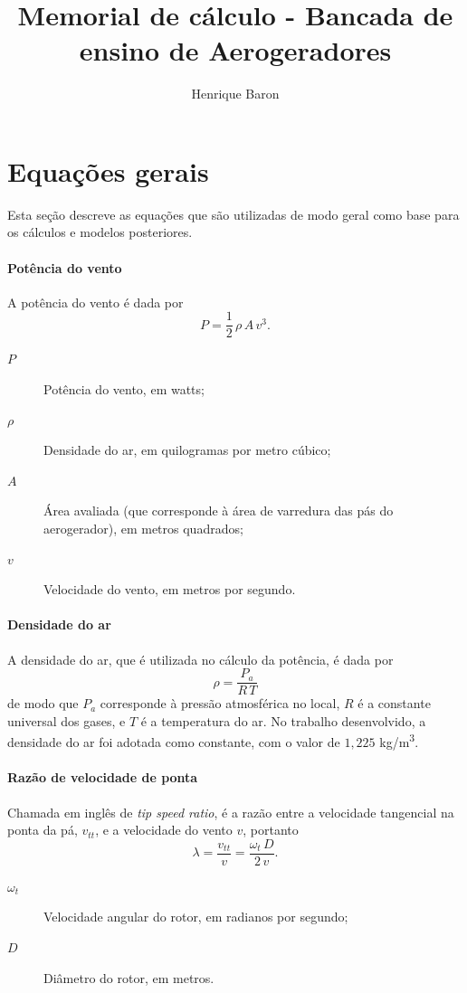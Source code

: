 \documentclass{article}
\title{Memorial de cálculo - Bancada de ensino de Aerogeradores}
\author{Henrique Baron}
\let\oldforeignlanguage\foreignlanguage
\renewcommand\foreignlanguage[2]{\oldforeignlanguage{#1}{\emph{#2}}}
\begin{document}
	\maketitle
	
	\section{Equações gerais}
	Esta seção descreve as equações que são utilizadas de modo geral como base para os cálculos e modelos posteriores.
	
	\paragraph{Potência do vento}
	A potência do vento é dada por
	\begin{equation} \label{eqn:pot-vento}
		P = \frac{1}{2}\,\rho\,A\,v^3 \text{.}
	\end{equation}
	\begin{description}
		\item[$ P $] Potência do vento, em watts;
		\item[$ \rho $] Densidade do ar, em quilogramas por metro cúbico;
		\item[$ A $] Área avaliada (que corresponde à área de varredura das pás do aerogerador), em metros quadrados;
		\item[$ v $] Velocidade do vento, em metros por segundo.
	\end{description}

	\paragraph{Densidade do ar}
	A densidade do ar, que é utilizada no cálculo da potência, é dada por
	\begin{equation}
		\rho = \frac{P_a}{R\,T}
	\end{equation}
	de modo que $ P_a $ corresponde à pressão atmosférica no local, $ R $ é a constante universal dos gases, e $T$ é a temperatura do ar.
	No trabalho desenvolvido, a densidade do ar foi adotada como constante, com o valor de $ 1,225 $ kg/m\textsuperscript{3}.
	
	\paragraph{Razão de velocidade de ponta}
	Chamada em inglês de \emph{\foreignlanguage{english}{tip speed ratio}}, é a razão entre a velocidade tangencial na ponta da pá, $v_{tt}$, e a velocidade do vento $v$, portanto
	\begin{equation} \label{eqn:tsr-definicao}
		\lambda = \frac{v_{tt}}{v} = \frac{\omega_t\,D}{2\,v} \text{.}
	\end{equation}
	\begin{description}
		\item[$\omega_t$] Velocidade angular do rotor, em radianos por segundo;
		\item[$D$] Diâmetro do rotor, em metros.
	\end{description}
\end{document}
